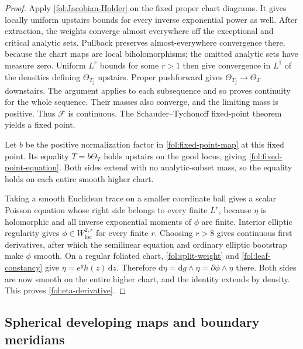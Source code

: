 \documentclass[11pt,letterpaper]{article}
\theoremstyle{definition}
\theoremstyle{remark}
\begin{document}
\begin{proof}
Apply \eqref{fol:Jacobian-Holder} on the fixed proper chart diagrams.
It gives locally uniform upstairs bounds for every inverse exponential
power as well.  After extraction, the weights converge almost everywhere
off the exceptional and critical analytic sets.  Pullback preserves
almost-everywhere convergence there, because the chart maps are local
biholomorphisms; the omitted analytic sets have measure zero.
Uniform $L^r$ bounds for some $r>1$ then give convergence in $L^1$
of the densities defining $\Theta_{T_j}$ upstairs.  Proper
pushforward gives $\Theta_{T_j}\to\Theta_T$ downstairs.  The argument
applies to each subsequence and so proves continuity for the whole
sequence.  Their masses also converge, and the limiting mass is positive.
Thus $\mathcal F$ is continuous.  The Schauder--Tychonoff fixed-point
theorem yields a fixed point.

Let $b$ be the positive normalization factor in
\eqref{fol:fixed-point-map} at this fixed point.  Its equality
$T=b\Theta_T$ holds upstairs on the good locus, giving
\eqref{fol:fixed-point-equation}.  Both sides extend with no
analytic-subset mass, so the equality holds on each entire smooth
higher chart.

Taking a smooth Euclidean trace on a smaller coordinate ball gives a
scalar Poisson equation whose right side belongs to every finite $L^r$,
because $\eta$ is holomorphic and all inverse exponential moments of
$\phi$ are finite.  Interior elliptic regularity gives
$\phi\in W^{2,r}_{\mathrm{loc}}$ for every finite $r$.
Choosing $r>8$ gives continuous first derivatives, after which the
semilinear equation and ordinary elliptic bootstrap make $\phi$ smooth.
On a regular foliated chart,
\eqref{fol:split-weight} and \eqref{fol:leaf-constancy} give
$\eta=e^g h(z)\,\mathrm{d} z$.  Therefore
$\mathrm{d}\eta=\mathrm{d} g\wedge\eta=\partial\phi\wedge\eta$ there.
Both sides are now smooth on the entire higher chart, and the identity
extends by density.  This proves \eqref{fol:eta-derivative}.
\end{proof}

\subsection{Spherical developing maps and boundary meridians}
\end{document}
